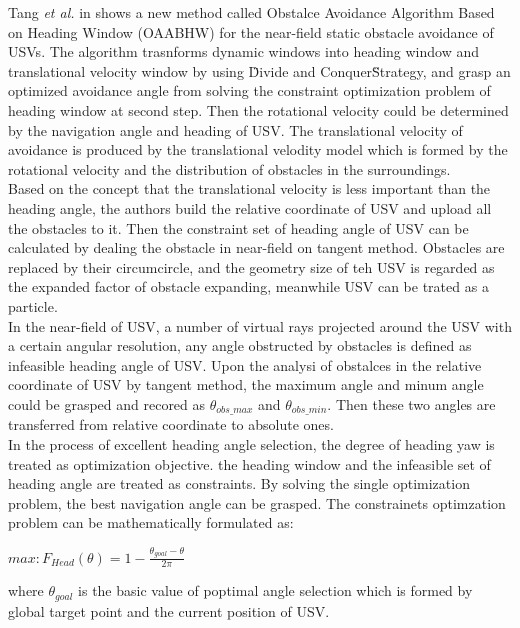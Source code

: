 \documentclass[journal]{IEEEtran}
\begin{document}
              Tang \textit{et al.} in \cite{Tang2012} shows a new method called Obstalce Avoidance Algorithm Based on Heading Window (OAABHW) for the near-field static obstacle avoidance of USVs. The algorithm trasnforms dynamic windows into heading window and translational velocity window by using \"Divide and Conquer\" Strategy, and grasp an optimized avoidance angle from solving the constraint optimization problem of heading window at second step. Then the rotational velocity could be determined by the navigation angle and heading of USV. The translational velocity of avoidance is produced by the translational velodity model which is formed by the rotational velocity and the distribution of obstacles in the surroundings.\\
              Based on the concept that the translational velocity is less important than the heading angle, the authors build the relative coordinate of USV and upload all the obstacles to it. Then the constraint set of heading angle of USV can be calculated by dealing the obstacle in near-field on tangent method. Obstacles are replaced by their circumcircle, and the geometry size of teh USV is regarded as the expanded factor of obstacle expanding, meanwhile USV can be trated as a particle.\\
              In the near-field of USV, a number of virtual rays projected around the USV with a certain angular resolution, any angle obstructed by obstacles is defined as infeasible heading angle of USV. Upon the analysi of obstalces in the relative coordinate of USV by tangent method, the maximum angle and minum angle could be grasped and recored as $\theta_{obs\_max}$ and $\theta_{obs\_min}$. Then these two angles are transferred from relative coordinate to absolute ones.\\
              In the process of excellent heading angle selection, the degree of heading yaw is treated as optimization objective. the heading window and the infeasible set of heading angle are treated as constraints. By solving the single optimization problem, the best navigation angle can be grasped. The constrainets optimzation problem can be mathematically formulated as:
                  \begin{center}
                        $max: F_{Head} (\theta) = 1 - \frac{\theta_{goal} - \theta}{2\pi}$
                  \end{center}
              where $\theta_{goal}$ is the basic value of poptimal angle selection which is formed by global target point and the current position of USV.\\
\end{document}
